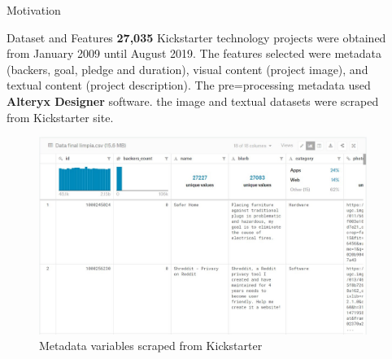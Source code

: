 \documentclass[final]{beamer}
\newlength{\sepwid}
\newlength{\onecolwid}
\newlength{\twocolwid}
\begin{document}
\begin{frame}[t]
\begin{columns}[t]
\begin{column}{\onecolwid}
\begin{block}{Motivation}
\end{block}

\begin{block}{Dataset and Features}
		\textbf{27,035} Kickstarter technology projects were obtained from January 2009 until August 2019. The features selected were metadata (backers, goal, pledge and duration), visual content (project image), and textual content (project description). The pre=processing metadata used  \textbf{Alteryx Designer} software. the image and textual datasets were scraped from Kickstarter site.
	\begin{figure}
			\includegraphics[width=0.8\linewidth]{metadata.jpg}
			\caption{Metadata variables scraped from Kickstarter}
		\end{figure}
	
\end{block}


\end{column} %




\begin{column}{\twocolwid} %
	
	


\end{column}
\end{columns}
\end{frame}
\end{document}
